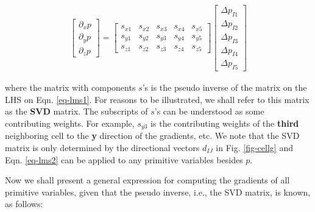 \documentclass[12pt, letterpaper]{report}
\begin{document}
\begin{align}\label{eq-lms2}
   \begin{bmatrix}\partial_x p \\ \partial_y p \\ \partial_z p\end{bmatrix} = 
   \begin{bmatrix}
      s_{x1} &s_{x2} &s_{x3} &s_{x4} &s_{x5} \\ 
      s_{y1} &s_{y2} &s_{y3} &s_{y4} &s_{y5} \\ 
      s_{z1} &s_{z2} &s_{z3} &s_{z4} &s_{z5}
   \end{bmatrix}
   \begin{bmatrix}\Delta p_{I1} \\\Delta p_{I2} \\\Delta p_{I3} \\\Delta p_{I4} \\\Delta p_{I5}\end{bmatrix}
\end{align}

where the matrix with components $s$'s is the pseudo inverse of the matrix on the LHS on Eqn.
\ref{eq-lms1}. For reasons to be illustrated, we shall refer to this matrix as the {\bf SVD} matrix.
The subscripts of $s$'s can be understood as some contributing weights. For example, $s_{y3}$ is the
contributing weights of the {\bf third} neighboring cell to the {\bf y} direction of the gradients,
etc. We note that the SVD matrix is only determined by the directional vectors $d_{IJ}$ in Fig.
\ref{fig-cellg} and Eqn. \ref{eq-lms2} can be applied to any primitive variables besides $p$.
\paraspace

Now we shall present a general expression for computing the gradients of all primitive variables,
given that the pseudo inverse, i.e., the SVD matrix, is known, as follows:
\end{document}
